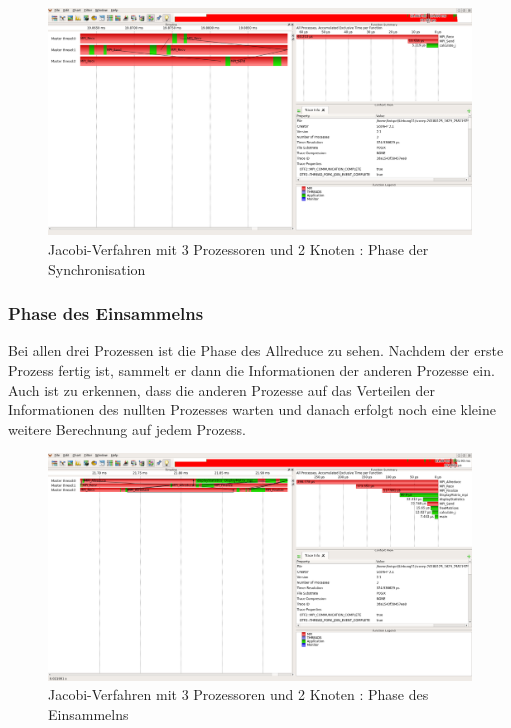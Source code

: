 \documentclass[11pt,a4paper]{article}
\begin{document}
\begin{figure}[htbp] %
   \centering
   \includegraphics[width=1\textwidth]{Jacobi_2.png} 
   \caption{Jacobi-Verfahren mit 3 Prozessoren und 2 Knoten : Phase der Synchronisation}
   \label{Jacobi_2}
\end{figure}

\subsubsection{Phase des Einsammelns}
Bei allen drei Prozessen ist die Phase des Allreduce zu sehen. Nachdem der erste Prozess fertig ist, sammelt er dann die Informationen der anderen Prozesse ein. Auch ist zu erkennen, dass die anderen Prozesse auf das Verteilen der Informationen des nullten Prozesses warten und danach erfolgt noch eine kleine weitere Berechnung auf jedem Prozess.

\begin{figure}[htbp] %
   \centering
   \includegraphics[width=1\textwidth]{Jacobi_3.png} 
   \caption{Jacobi-Verfahren mit 3 Prozessoren und 2 Knoten : Phase des Einsammelns}
   \label{Jacobi_3}
\end{figure}
\end{document}

